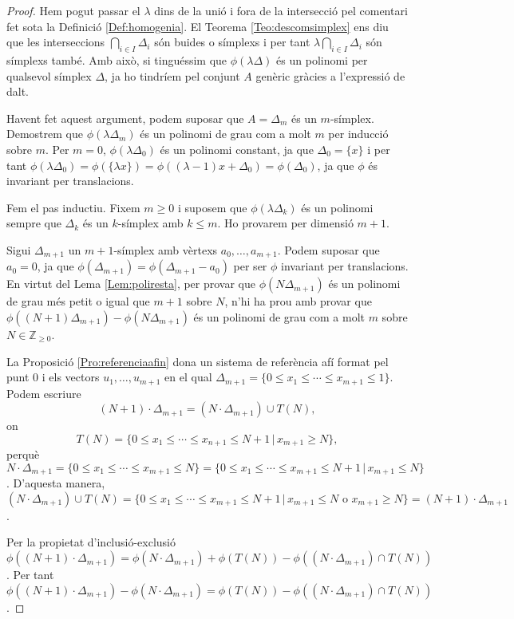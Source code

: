 \documentclass{article}
\theoremstyle{definition}
\begin{document}
\begin{proof}
Hem pogut passar el $\lambda$ dins de la uni\'{o} i fora de la intersecci\'{o} pel comentari fet sota la Definici\'{o} \ref{Def:homogenia}. El Teorema \ref{Teo:descomsimplex} ens diu que les interseccions $\bigcap_{i\in I}\Delta_i$ s\'{o}n buides o s\'{i}mplexs i per tant $\lambda\bigcap_{i\in I}\Delta_i$ s\'{o}n s\'{i}mplexs tamb\'{e}. Amb aix\`{o}, si tingu\'{e}ssim que $\phi(\lambda\Delta)$ \'{e}s un polinomi per qualsevol s\'{i}mplex $\Delta$, ja ho tindr\'{i}em pel conjunt $A$ gen\`{e}ric gr\`{a}cies a l'expressi\'{o} de dalt.

Havent fet aquest argument, podem suposar que $A=\Delta_m$ \'{e}s un $m$-s\'{i}mplex. Demostrem que $\phi(\lambda\Delta_m)$ \'{e}s un polinomi de grau com a molt $m$ per inducci\'{o} sobre $m$. Per $m=0$, $\phi(\lambda\Delta_0)$ \'{e}s un polinomi constant, ja que $\Delta_0=\{x\}$ i per tant $\phi(\lambda\Delta_0)=\phi(\{\lambda x\})=\phi((\lambda-1)x+\Delta_0)=\phi(\Delta_0)$, ja que $\phi$ \'{e}s invariant per translacions.

Fem el pas inductiu. Fixem $m\geq0$ i suposem que $\phi(\lambda\Delta_k)$ \'{e}s un polinomi sempre que $\Delta_k$ \'{e}s un $k$-s\'{i}mplex amb $k\leq m$. Ho provarem per dimensi\'{o} $m+1$.

Sigui $\Delta_{m+1}$ un $m+1$-s\'{i}mplex amb v\`{e}rtexs $a_0,\ldots,a_{m+1}$. Podem suposar que $a_0=0$, ja que $\phi(\Delta_{m+1})=\phi(\Delta_{m+1}-a_0)$ per ser $\phi$ invariant per translacions. En virtut del Lema \ref{Lem:poliresta}, per provar que $\phi(N\Delta_{m+1})$ \'{e}s un polinomi de grau m\'{e}s petit o igual que $m+1$ sobre $N$, n'hi ha prou amb provar que $\phi((N+1)\Delta_{m+1})-\phi(N\Delta_{m+1})$ \'{e}s un polinomi de grau com a molt $m$ sobre $N\in\mathbb{Z}_{\geq0}$.

La Proposici\'{o} \ref{Pro:referenciaafin} dona un sistema de refer\`{e}ncia af\'{i} format pel punt $0$ i els vectors $u_1,\ldots,u_{m+1}$ en el qual $\Delta_{m+1}=\{0\leq x_1\leq\cdots\leq x_{m+1}\leq1\}$. Podem escriure
\[(N+1)\cdot\Delta_{m+1}=(N\cdot\Delta_{m+1})\cup T(N),\]
on
\[T(N)=\{0\leq x_1\leq\cdots\leq x_{n+1}\leq N+1\,|\,x_{m+1}\geq N\},\]
perqu\`{e} $N\cdot\Delta_{m+1}=\{0\leq x_1\leq\cdots\leq x_{m+1}\leq N\}=\{0\leq x_1\leq\cdots\leq x_{m+1}\leq N+1\,|\,x_{m+1}\leq N\}$. D'aquesta manera, $(N\cdot\Delta_{m+1})\cup T(N)=\{0\leq x_1\leq\cdots\leq x_{m+1}\leq N+1\,|\,x_{m+1}\leq N\text{ o }x_{m+1}\geq N\}=(N+1)\cdot\Delta_{m+1}$.

Per la propietat d'inclusi\'{o}-exclusi\'{o} $\phi((N+1)\cdot\Delta_{m+1})=\phi(N\cdot\Delta_{m+1})+\phi(T(N))-\phi((N\cdot\Delta_{m+1})\cap T(N))$. Per tant $\phi((N+1)\cdot\Delta_{m+1})-\phi(N\cdot\Delta_{m+1})=\phi(T(N))-\phi((N\cdot\Delta_{m+1})\cap T(N))$.


\end{proof}
\end{document}

